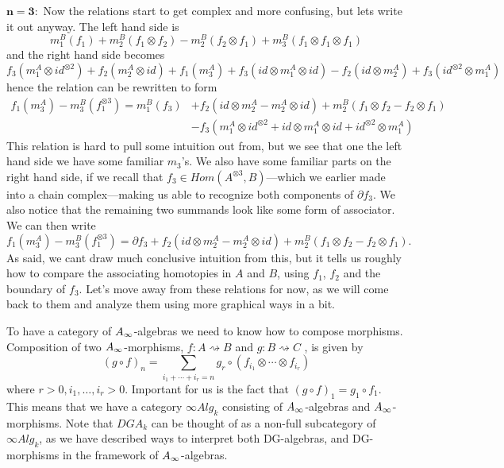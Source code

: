 $\mathbf{n=3:}$ Now the relations start to get complex and more confusing, but lets write it out anyway. The left hand side is 
\begin{equation*}
m_1^B(f_1)+m_2^B(f_1\otimes f_2)-m_2^B(f_2\otimes f_1)+m_3^B(f_1\otimes f_1\otimes f_1)
\end{equation*}
and the right hand side becomes
\begin{equation*}
f_3(m_1^A\otimes id^{\otimes 2})+f_2(m_2^A\otimes id)+f_1(m_3^A)+f_3(id\otimes m_1^A\otimes id)-f_2(id\otimes m_2^A)+f_3(id^{\otimes 2}\otimes m_1^A)
\end{equation*}
hence the relation can be rewritten to form 
\begin{align*}
    f_1(m_3^A)
    -m_3^B(f_1^{\otimes 3})
    = 
    m_1^B(f_3)
    &+f_2(id\otimes m_2^A-m_2^A\otimes id)
    +m_2^B(f_1\otimes f_2 - f_2\otimes f_1) \\
    &-f_3(m_1^A\otimes id^{\otimes 2}+id\otimes m_1^A\otimes id+id^{\otimes 2}\otimes m_1^A)
\end{align*}
This relation is hard to pull some intuition out from, but we see that one the left hand side we have some familiar $m_3$'s. We also have some familiar parts on the right hand side, if we recall that $f_3\in Hom(A^{\otimes 3}, B)$---which we earlier made into a chain complex---making us able to recognize both components of $\partial f_3$. We also notice that the remaining two summands look like some form of associator. We can then write
\begin{equation*}
    f_1(m_3^A)-m_3^B(f_1^{\otimes 3}) = \partial f_3 + f_2(id\otimes m_2^A-m_2^A\otimes id)
    +m_2^B(f_1\otimes f_2 - f_2\otimes f_1).
\end{equation*}
As said, we cant draw much conclusive intuition from this, but it tells us roughly how to compare the associating homotopies in $A$ and $B$, using $f_1$, $f_2$ and the boundary of $f_3$. Let's move away from these relations for now, as we will come back to them and analyze them using more graphical ways in a bit. 

To have a category of $A_{\infty}$-algebras we need to know how to compose morphisms. Composition of two $A_{\infty}$-morphisms, $f\colon A\rightsquigarrow B$ and $g\colon B\rightsquigarrow C$
, is given by 
\begin{equation*}
    (g\circ f)_n = \sum_{i_1+\cdots + i_r = n}g_r\circ (f_{i_1}\otimes \cdots \otimes f_{i_r})
\end{equation*}
where $r>0, i_1, \ldots, i_r>0$. Important for us is the fact that $(g\circ f)_1 = g_1\circ f_1$. This means that we have a category $\infty Alg_k$ consisting of $A_{\infty}$-algebras and $A_{\infty}$-morphisms. Note that $DGA_k$ can be thought of as a non-full subcategory of $\infty Alg_k$, as we have described ways to interpret both DG-algebras, and DG-morphisms in the framework of $A_{\infty}$-algebras.  

